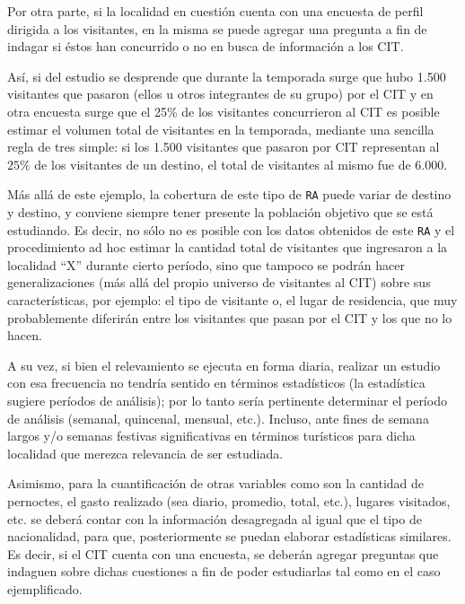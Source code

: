 \documentclass[
]{book}
\begin{document}
Por otra parte, si la localidad en cuestión cuenta con una encuesta de perfil dirigida a los visitantes, en la misma se puede agregar una pregunta a fin de indagar si éstos han concurrido o no en busca de información a los CIT.

Así, si del estudio se desprende que durante la temporada surge que hubo 1.500 visitantes que pasaron (ellos u otros integrantes de su grupo) por el CIT y en otra encuesta surge que el 25\% de los visitantes concurrieron al CIT es posible estimar el volumen total de visitantes en la temporada, mediante una sencilla regla de tres simple: si los 1.500 visitantes que pasaron por CIT representan al \(25\%\) de los visitantes de un destino, el total de visitantes al mismo fue de 6.000.

Más allá de este ejemplo, la cobertura de este tipo de \texttt{RA} puede variar de destino y destino, y conviene siempre tener presente la población objetivo que se está estudiando. Es decir, no sólo no es posible con los datos obtenidos de este \texttt{RA} y el procedimiento ad hoc estimar la cantidad total de visitantes que ingresaron a la localidad ``X'' durante cierto período, sino que tampoco se podrán hacer generalizaciones (más allá del propio universo de visitantes al CIT) sobre sus características, por ejemplo: el tipo de visitante o, el lugar de residencia, que muy probablemente diferirán entre los visitantes que pasan por el CIT y los que no lo hacen.

A su vez, si bien el relevamiento se ejecuta en forma diaria, realizar un estudio con esa frecuencia no tendría sentido en términos estadísticos (la estadística sugiere períodos de análisis); por lo tanto sería pertinente determinar el período de análisis (semanal, quincenal, mensual, etc.). Incluso, ante fines de semana largos y/o semanas festivas significativas en términos turísticos para dicha localidad que merezca relevancia de ser estudiada.

Asimismo, para la cuantificación de otras variables como son la cantidad de pernoctes, el gasto realizado (sea diario, promedio, total, etc.), lugares visitados, etc. se deberá contar con la información desagregada al igual que el tipo de nacionalidad, para que, posteriormente se puedan elaborar estadísticas similares. Es decir, si el CIT cuenta con una encuesta, se deberán agregar preguntas que indaguen sobre dichas cuestiones a fin de poder estudiarlas tal como en el caso ejemplificado.
\end{document}

